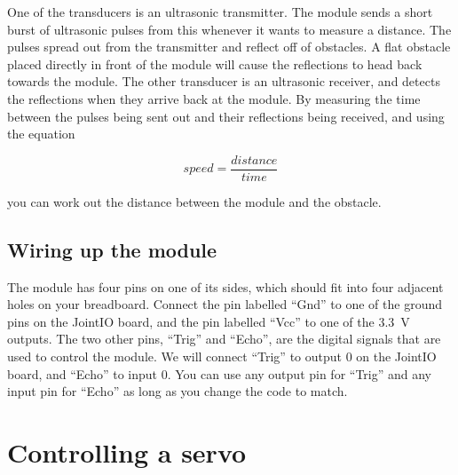 \documentclass{article}
\begin{document}
One of the transducers is an ultrasonic transmitter. The module sends a short
burst of ultrasonic pulses from this whenever it wants to measure a distance.
The pulses spread out from the transmitter and reflect off of obstacles. A flat
obstacle placed directly in front of the module will cause the reflections to
head back towards the module. The other transducer is an ultrasonic receiver,
and detects the reflections when they arrive back at the module. By measuring
the time between the pulses being sent out and their reflections being received,
and using the equation

\begin{equation*}
speed = \frac{distance}{time}
\end{equation*}

you can work out the distance between the module and the obstacle.

\subsection{Wiring up the module}

The module has four pins on one of its sides, which should fit into four
adjacent holes on your breadboard. Connect the pin labelled ``Gnd'' to one of
the ground pins on the JointIO board, and the pin labelled ``Vcc'' to one of the
\SI{3.3}{\volt} outputs. The two other pins, ``Trig'' and ``Echo'', are the
digital signals that are used to control the module. We will connect ``Trig''
to output 0 on the JointIO board, and ``Echo'' to input 0. You can use any
output pin for ``Trig'' and any input pin for ``Echo'' as long as you change the
code to match.


\section{Controlling a servo}
\end{document}
